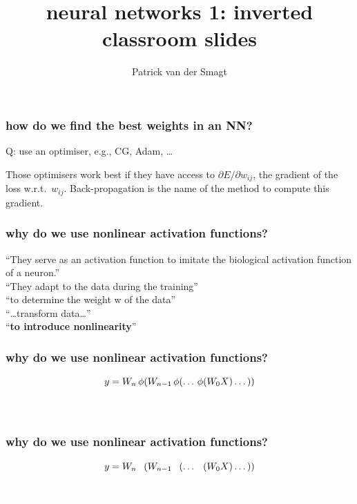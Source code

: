 \documentclass[USenglish,pdftex,compress,10pt,svgnamesi,handout]{beamer}
\title{neural networks 1:  inverted classroom slides}
\author{Patrick van der Smagt}
\date{}
\begin{document}
\lstset{language=Pascal}


\begin{frame}
	\titlepage
	
	\vfil
\end{frame}









\begin{frame}
    \frametitle{how do we find the best weights in an NN?}

Q: use an optimiser, e.g., CG, Adam, \dots

\pause
Those optimisers work best if they have access to $\partial E / \partial w_{ij}$, the gradient of the loss w.r.t.\ $w_{ij}$.
Back-propagation is the name of the method to compute this gradient.
\end{frame}




\begin{frame}
    \frametitle{why do we use nonlinear activation functions?}


``They serve as an activation function to imitate the biological activation function of a neuron.''\\
``They adapt to the data during the training''\\
``to determine the weight w of the data''\\
``\dots transform data\dots''\\
``\textbf{to introduce nonlinearity}''
\end{frame}

\begin{frame}
    \frametitle{why do we use nonlinear activation functions?}
    
    \begin{align}
    y &= W_n \,\phi( W_{n-1} \,\phi (\dots \,\phi(W_0 X) \dots))\nonumber \\
          &\textcolor{white}{= W_n W_{n-1} \dots W_1 W_0 X}\nonumber\\
                    &\textcolor{white}{= W'X}\nonumber
    \end{align}

\end{frame}


\begin{frame}
    \frametitle{why do we use nonlinear activation functions? }
    
    \begin{align}
        y &= W_n \,\textcolor{white}{\phi}( W_{n-1} \,\textcolor{white}{\phi} (\dots \,\textcolor{white}{\phi}(W_0 X) \dots))\nonumber\\
          &\textcolor{white}{= W_n W_{n-1} \dots W_1 W_0 X}\nonumber\\
          &\textcolor{white}{= W'X}\nonumber
    \end{align}
\end{frame}
\end{document}
